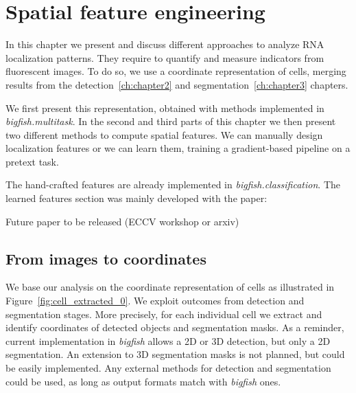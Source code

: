 
\graphicspath{{./figures/chapter4/}}


\chapter{Spatial feature engineering}
\label{ch:chapter4}

\minitoc
\newpage

In this chapter we present and discuss different approaches to analyze \ac{RNA} localization patterns.
They require to quantify and measure indicators from fluorescent images.
To do so, we use a coordinate representation of cells, merging results from the detection~\ref{ch:chapter2} and segmentation~\ref{ch:chapter3} chapters.

We first present this representation, obtained with methods implemented in \emph{bigfish.multitask}.
In the second and third parts of this chapter we then present two different methods to compute spatial features.
We can manually design localization features or we can learn them, training a gradient-based pipeline on a pretext task.

The hand-crafted features are already implemented in \emph{bigfish.classification}.
The learned features section was mainly developed with the paper:

\begin{center}
	\color{green}
	Future paper to be released (ECCV workshop or arxiv)
\end{center}

\section{From images to coordinates}
\label{sec:image_coordinates}

We base our analysis on the coordinate representation of cells as illustrated in Figure~\ref{fig:cell_extracted_0}.
We exploit outcomes from detection and segmentation stages.
More precisely, for each individual cell we extract and identify coordinates of detected objects and segmentation masks.
As a reminder, current implementation in \emph{bigfish} allows a 2D or 3D detection, but only a 2D segmentation.
An extension to 3D segmentation masks is not planned, but could be easily implemented.
Any external methods for detection and segmentation could be used, as long as output formats match with \emph{bigfish} ones.

